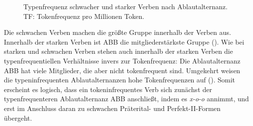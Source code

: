 \begin{figure}
\caption{Typenfrequenz schwacher und starker Verben nach Ablaut\-al\-tern\-anz. TF: Tokenfrequenz pro Millionen Token.}
\label{anteil}
\end{figure}

Die schwachen Verben machen die größte Gruppe innerhalb der Verben aus. Innerhalb der starken Verben ist ABB die mitgliederstärkste Gruppe (\cite[136]{Nowak.2016}). Wie bei starken und schwachen Verben stehen auch innerhalb der starken Verben die typenfrequentiellen Verhältnisse invers zur Tokenfrequenz: Die Ablautalternanz ABB hat viele Mitglieder, die aber nicht tokenfrequent sind. Umgekehrt weisen die typeninfrequenten Ablautalternanzen hohe Tokenfrequenzen auf (\cite[141]{Nowak.2016}). Somit erscheint es logisch, dass ein tokeninfrequentes Verb sich zunächst der typenfrequenteren Ablautalternanz ABB anschließt, indem es \textit{x-o-o} annimmt, und erst im Anschluss daran zu schwachen Präterital- und Perfekt-II-Formen übergeht. 

